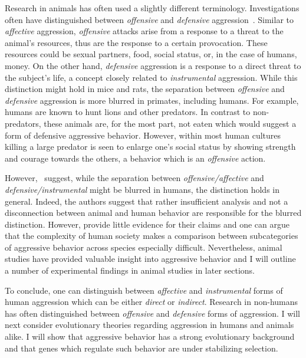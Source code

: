 Research in animals has often used a slightly different terminology.
Investigations often have distinguished between \textit{offensive} and \textit{defensive} aggression~\cite{Blanchard2005b}.
Similar to \textit{affective} aggression, \textit{offensive} attacks arise from a response to a threat to the animal's resources, thus are the response to a certain provocation.
These resources could be sexual partners, food, social status, or, in the case of humans, money.
On the other hand, \textit{defensive} aggression is a response to a direct threat to the subject's life, a concept closely related to \textit{instrumental} aggression.
While this distinction might hold in mice and rats, the separation between \textit{offensive} and \textit{defensive} aggression is more blurred in primates, including humans.
For example, humans are known to hunt lions and other predators.
In contrast to non-predators, these animals are, for the most part, not eaten which would suggest a form of defensive aggressive behavior.
However, within most human cultures killing a large predator is seen to enlarge one's social status by showing strength and courage towards the others,
a behavior which is an \textit{offensive} action.

However,~\citet{Blanchard2005b} suggest, while the separation between \textit{offensive/affective}  and \textit{defensive/instrumental} might be blurred in humans, the distinction holds in general.
Indeed, the authors suggest that rather insufficient analysis and not a disconnection between animal and human behavior are responsible for the blurred distinction.
However, \citet{Blanchard2005b} provide little evidence for their claims and one can argue that the complexity of human society makes a comparison between subcategories of aggressive behavior across species especially difficult. 
Nevertheless, animal studies have provided valuable insight into aggressive behavior and I will outline a number of experimental findings in animal studies in later sections.

To conclude, one can distinguish between \textit{affective} and \textit{instrumental} forms of human aggression which can be  either \textit{direct} or \textit{indirect}.
Research in non-humans has often distinguished between \textit{offensive} and \textit{defensive} forms of aggression.
I will next consider evolutionary theories regarding aggression in humans and animals alike.
I will show that aggressive behavior has a strong evolutionary background and that genes which regulate such behavior are under stabilizing selection.

